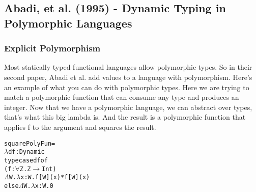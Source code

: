 \documentclass[12pt]{article}	%
\begin{document}

\subsection*{Abadi, et al. (1995) - Dynamic Typing in Polymorphic Languages}

\subsubsection*{Explicit Polymorphism}
Most statically typed functional languages allow polymorphic types. So in their second paper, Abadi et al. add \Dynamic values to a language with polymorphism. Here's an example of what you can do with polymorphic types. Here we are trying to match a polymorphic function that can consume any type and produces an integer. Now that we have a polymorphic language, we can abstract over types, that's what this big lambda is. And the result is a polymorphic function that applies f to the argument and squares the result.

\begin{alltt}
squarePolyFun = 
  \(\lambda\)df:Dynamic
    typecase df of
      (f:\(\forall\)Z.Z\(\rightarrow\)Int)
        \(\Lambda\)W.\(\lambda\)x:W.f[W](x)*f[W](x)
      else \(\Lambda\)W.\(\lambda\)x:W.0
\end{alltt}
\end{document}
